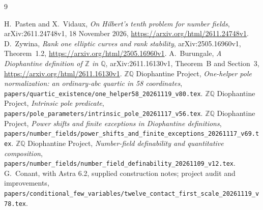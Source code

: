 \documentclass[11pt,a4paper]{article}
\newcommand{\Q}{\mathbb Q}\newcommand{\Z}{\mathbb Z}
\begin{document}
\begin{thebibliography}{9}\footnotesize\raggedright
\setlength{\itemsep}{1pt}
 H.~Pasten and X.~Vidaux,
\emph{On Hilbert's tenth problem for number fields},
arXiv:2611.24748v1, 18 November 2026,
\url{https://arxiv.org/html/2611.24748v1}.
 D.~Zywina,
\emph{Rank one elliptic curves and rank stability},
arXiv:2505.16960v1, Theorem~1.2,
\url{https://arxiv.org/html/2505.16960v1}.
 A.~Burungale,
\emph{A Diophantine definition of $\Z$ in $\Q$},
arXiv:2611.16130v1, Theorem~B and Section~3,
\url{https://arxiv.org/html/2611.16130v1}.
 \(\Z\Q\) Diophantine Project,
\emph{One-helper pole normalization: an ordinary-abc quartic in 58 coordinates},
\nolinkurl{papers/quartic_existence/one_helper58_20261119_v80.tex}.
 \(\Z\Q\) Diophantine Project,
\emph{Intrinsic pole predicate},
\nolinkurl{papers/pole_parameters/intrinsic_pole_20261117_v56.tex}.
 \(\Z\Q\) Diophantine Project,
\emph{Power shifts and finite exceptions in Diophantine definitions},
\nolinkurl{papers/number_fields/power_shifts_and_finite_exceptions_20261117_v69.tex}.
 \(\Z\Q\) Diophantine Project,
\emph{Number-field definability and quantitative composition},
\nolinkurl{papers/number_fields/number_field_definability_20261109_v12.tex}.
 G.~Conant, with Astra 6.2, supplied construction notes;
project audit and improvements,
\nolinkurl{papers/conditional_few_variables/twelve_contact_first_scale_20261119_v78.tex}.
\end{thebibliography}
\end{document}
